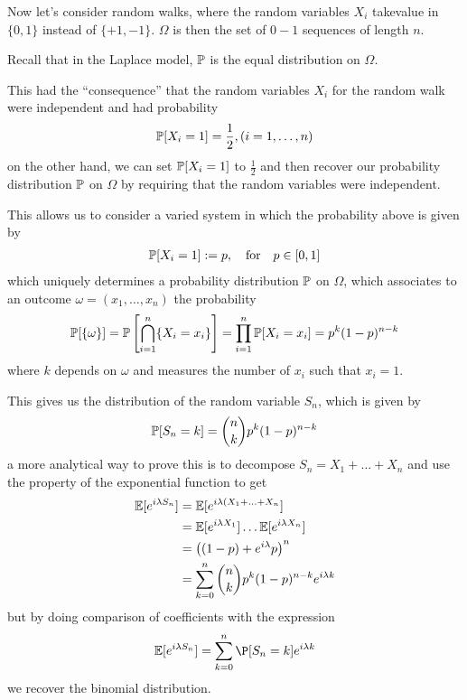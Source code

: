 Now let's consider random walks, where the random variables $X_i$ takevalue in $\{0,1\}$ instead of $\{+1,-1\}$.
$\Omega$ is then the set of $0-1$ sequences of length $n$.

Recall that in the Laplace model, $\mathbb{P}$ is the equal distribution on $\Omega$.

This had the ``consequence'' that the random variables $X_i$ for the random walk were independent and had probability
\begin{align*}
  \mathbb{P}[X_i = 1] = \frac{1}{2}, (i = 1, \ldots, n)
\end{align*}
on the other hand, we can set $\mathbb{P}[X_i = 1]$ to $\frac{1}{2}$ and then recover our probability distribution $\mathbb{P}$ on $\Omega$ by requiring that the random variables were independent.

This allows us to consider a varied system in which the probability above is given by
\begin{align*}
  \mathbb{P}[X_i = 1] := p, \quad \text{for} \quad p \in [0,1]
\end{align*}
which uniquely determines a probability distribution $\mathbb{P}$ on $\Omega$, which associates to an outcome $\omega = (x_{1}, \ldots, x_{n})$ the probability
\begin{align*}
  \mathbb{P}[\{\omega\}] = \mathbb{P}\left[
    \bigcap_{i=1}^{n}\{X_i = x_i\}
  \right]
  =
  \prod_{i=1}^{n}\mathbb{P}[X_i = x_i]
  = p^{k}(1-p)^{n-k}
\end{align*}
where $k$ depends on $\omega$ and measures the number of $x_i$ such that $x_i = 1$.

This gives us the distribution of the random variable $S_n$, which is given by
\begin{align*}
  \mathbb{P}[S_n = k] = \binom{n}{k}p^{k}(1-p)^{n-k}
\end{align*}
a more analytical way to prove this is to decompose $S_n = X_1 + \ldots + X_n$ and use the property of the exponential function to get
\begin{align*}
  \mathbb{E}[e^{i \lambda S_n}] 
  &=
  \mathbb{E}[e^{i \lambda(X_{1}+ \ldots + X_{n}}]\\
  &=
  \mathbb{E}[e^{i \lambda X_1}] \dots \mathbb{E}[e^{i \lambda X_n}]\\
  &=
  \left(
    (1-p) + e^{i \lambda}p
  \right)^{n}\\
  &=
  \sum_{k=0}^{n}\binom{n}{k}p^{k}(1-p)^{n-k}e^{i \lambda k}
\end{align*}
but by doing comparison of coefficients with the expression
\begin{align*}
  \E[e^{i \lambda S_n}] = \sum_{k=0}^{n}\P[S_n = k]e^{i \lambda k}
\end{align*}
we recover the binomial distribution.


